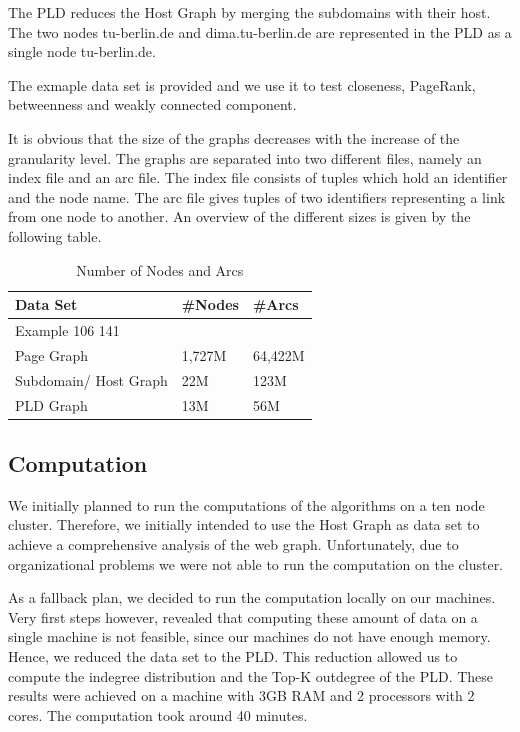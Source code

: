 The PLD reduces the Host Graph by merging the subdomains with their host. The two nodes tu-berlin.de and dima.tu-berlin.de are represented in the PLD as a single node tu-berlin.de.

The exmaple data set is provided and we use it to test closeness, PageRank, betweenness and weakly connected component.

It is obvious that the size of the graphs decreases with the increase of the granularity level. The graphs are separated into two different files, namely an index file and an arc file. The index file consists of tuples which hold an identifier and the node name. The arc file gives tuples of two identifiers representing a link from one node to another. An overview of the different sizes is given by the following table.

\begin{table}[H]
	\caption{Number of Nodes and Arcs}
	\label{t2}
	\begin{center}
		\begin{tabular}{|l|l|l|}
			\hline
			Data Set	&\#Nodes	&\#Arcs \\ \hline
			Example	        106		141	\\ \hline
			Page Graph	&1,727M	&64,422M	\\	\hline
			Subdomain/ Host Graph	&22M	&123M	\\	\hline		
			PLD Graph	&13M	&56M	\\	\hline				
		\end{tabular}
	\end{center}
\end{table}

\subsection{Computation}
We initially planned to run the computations of the algorithms on a ten node cluster. Therefore, we initially intended to use the Host Graph as data set to achieve a comprehensive  analysis of the web graph. Unfortunately, due to organizational problems we were not able to run the computation on the cluster.

As a fallback plan, we decided to run the computation locally on our machines. Very first steps however, revealed that computing these amount of data on a single machine is not feasible, since our machines do not have enough memory. Hence, we reduced the data set to the PLD. This reduction allowed us to compute the indegree distribution and the Top-K outdegree of the PLD. These results were achieved on a machine with 3GB RAM and 2 processors with 2 cores. The computation took around 40 minutes. 

